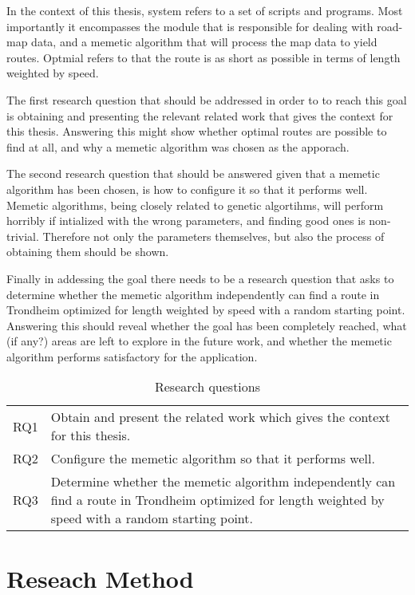 In the context of this thesis, system refers to a set of scripts and programs. Most importantly it encompasses the module that is responsible for dealing with road-map data, and a memetic algorithm that will process the map data to yield routes. Optmial refers to that the route is as short as possible in terms of length weighted by speed.

The first research question that should be addressed in order to to reach this goal is obtaining and presenting the relevant related work that gives the context for this thesis. Answering this might show whether optimal routes are possible to find at all, and why a memetic algorithm was chosen as the apporach.

The second research question that should be answered given that a memetic algorithm has been chosen, is how to configure it so that it performs well. Memetic algorithms, being closely related to genetic algortihms, will perform horribly if intialized with the wrong parameters, and finding good ones is non-trivial. Therefore not only the parameters themselves, but also the process of obtaining them should be shown.

Finally in addessing the goal there needs to be a research question that asks to determine whether the memetic algorithm independently can find a route in Trondheim optimized for length weighted by speed with a random starting point. Answering this should reveal whether the goal has been completely reached, what (if any?) areas are left to explore in the future work, and whether the memetic algorithm performs satisfactory for the application.

\begin{table}[H]
\centering
\begin{tabular}{cp{}}
RQ1  &  Obtain and present the related work which gives the context for this thesis. \\
RQ2  &  Configure the memetic algorithm so that it performs well.\\
RQ3  &  Determine whether the memetic algorithm independently can find a route in Trondheim optimized for length weighted by speed with a random starting point. \\
\end{tabular}
\caption{Research questions}
\label{tab:research_questions}
\end{table}

\section{Reseach Method}


